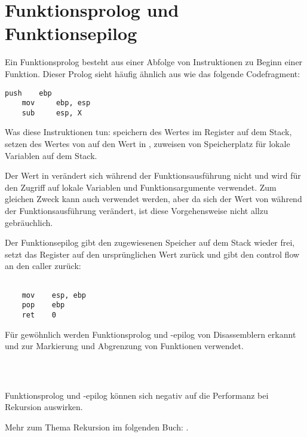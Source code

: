\section{Funktionsprolog und Funktionsepilog}
\label{sec:prologepilog}

Ein Funktionsprolog besteht aus einer Abfolge von Instruktionen zu Beginn einer
Funktion. Dieser Prolog sieht häufig ähnlich aus wie das folgende Codefragment:

\begin{lstlisting}[style=customasmx86]
    push    ebp
    mov     ebp, esp
    sub     esp, X
\end{lstlisting}

Was diese Instruktionen tun: speichern des Wertes im \EBP Register auf dem
Stack, setzen des Wertes von \EBP auf den Wert in \ESP, zuweisen von Speicherplatz für lokale
Variablen auf dem Stack.

Der Wert in \EBP verändert sich während der Funktionsausführung nicht und wird
für den Zugriff auf lokale Variablen und Funktionsargumente verwendet. Zum
gleichen Zweck kann auch \ESP verwendet werden, aber da sich der Wert von \ESP
während der Funktionsausführung verändert, ist diese Vorgehensweise nicht allzu
gebräuchlich.

Der Funktionsepilog gibt den zugewiesenen Speicher auf dem Stack wieder frei,
setzt das \EBP Register auf den ursprünglichen Wert zurück und gibt den control
flow an den \gls{caller} zurück:

\begin{lstlisting}[style=customasmx86]

    mov    esp, ebp
    pop    ebp
    ret    0
\end{lstlisting}

Für gewöhnlich werden Funktionsprolog und -epilog von Disassemblern erkannt und
zur Markierung und Abgrenzung von Funktionen verwendet.

　
\subsection{\Rekursion}

\myindex{\Recursion}
Funktionsprolog und -epilog können sich negativ auf die Performanz bei Rekursion
auswirken. 

Mehr zum Thema Rekursion im folgenden Buch: .
